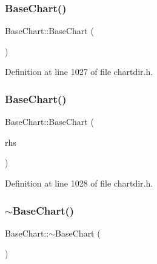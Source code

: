 \subsubsection{\texorpdfstring{Base\+Chart()}{BaseChart()}\hspace{0.1cm}{\footnotesize\ttfamily [1/2]}}
{\footnotesize\ttfamily Base\+Chart\+::\+Base\+Chart (\begin{DoxyParamCaption}{ }\end{DoxyParamCaption})\hspace{0.3cm}{\ttfamily [inline]}}



Definition at line 1027 of file chartdir.\+h.

\mbox{\label{class_base_chart_a40e20ec8257eebc80618426119a0bfd6}} 
\subsubsection{\texorpdfstring{Base\+Chart()}{BaseChart()}\hspace{0.1cm}{\footnotesize\ttfamily [2/2]}}
{\footnotesize\ttfamily Base\+Chart\+::\+Base\+Chart (\begin{DoxyParamCaption}\item[{\hyperlink{class_base_chart}{Base\+Chart} $\ast$}]{rhs }\end{DoxyParamCaption})\hspace{0.3cm}{\ttfamily [inline]}}



Definition at line 1028 of file chartdir.\+h.

\mbox{\label{class_base_chart_a4a4e22d0f3a1ae31032a3869406c4b0d}} 
\subsubsection{\texorpdfstring{$\sim$\+Base\+Chart()}{~BaseChart()}}
{\footnotesize\ttfamily Base\+Chart\+::$\sim$\+Base\+Chart (\begin{DoxyParamCaption}{ }\end{DoxyParamCaption})\hspace{0.3cm}{\ttfamily [inline]}}



